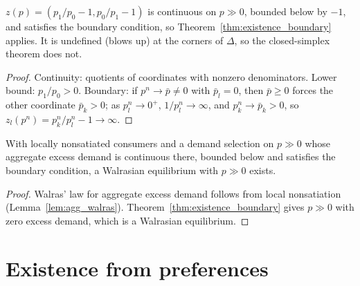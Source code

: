\begin{theorem}
\label{thm:zcd_boundary}
\leanok
{}
$z(p) = (p_1/p_0 - 1, p_0/p_1 - 1)$ is continuous on $p \gg 0$, bounded below by $-1$, and satisfies the boundary
condition, so Theorem~\ref{thm:existence_boundary} applies. It is undefined (blows up) at the corners of $\Delta$, so the
closed-simplex theorem does not.
\end{theorem}
\begin{proof}
\leanok
Continuity: quotients of coordinates with nonzero denominators. Lower bound: $p_1/p_0 > 0$. Boundary: if
$p^n \to \bar p \ne 0$ with $\bar p_l = 0$, then $\bar p \ge 0$ forces the other coordinate $\bar p_k > 0$; as
$p^n_l \to 0^+$, $1/p^n_l \to \infty$, and $p^n_k \to \bar p_k > 0$, so $z_l(p^n) = p^n_k/p^n_l - 1 \to \infty$.
\end{proof}

\begin{theorem}
\label{thm:existence_boundary_economy}
\leanok
{}
With locally nonsatiated consumers and a demand selection on $p \gg 0$ whose aggregate excess demand is continuous there,
bounded below and satisfies the boundary condition, a Walrasian equilibrium with $p \gg 0$ exists.
\end{theorem}
\begin{proof}
\leanok
Walras' law for aggregate excess demand follows from local nonsatiation (Lemma~\ref{lem:agg_walras}). Theorem~\ref{thm:existence_boundary}
gives $p \gg 0$ with zero excess demand, which is a Walrasian equilibrium.
\end{proof}

\section{Existence from preferences}
\label{sec:existence_preferences}

